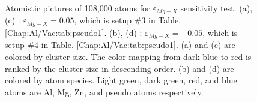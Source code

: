 \begin{figure}[!ht]
\caption[Atomistic pictures of 108,000 atoms for $\varepsilon_{Mg-X}$ sensitivity test.]{Atomistic pictures of 108,000 atoms for $\varepsilon_{Mg-X}$ sensitivity test. (a), (c) : $\varepsilon_{Mg-X} = 0.05$, which is setup \#3 in Table. \ref{Chap:Al/Vac:tab:pseudo1}. (b), (d) : $\varepsilon_{Mg-X} = -0.05$, which is setup \#4 in Table. \ref{Chap:Al/Vac:tab:pseudo1}. (a) and (c) are colored by cluster size. The color mapping from dark blue to red is ranked by the cluster size in descending order. (b) and (d) are colored by atom species. Light green, dark green, red, and blue atoms are Al, Mg, Zn, and pseudo atoms respectively.}
\label{Chap:Al/Vac:fig:sens_Mg}
\end{figure}
\endgroup

